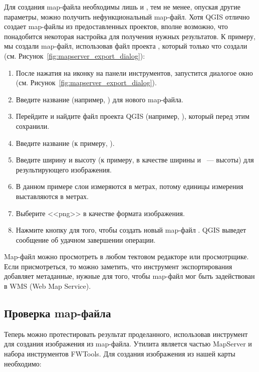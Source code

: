 Для создания map-файла необходимы лишь  и
, тем не менее, опуская другие параметры,
можно получить нефункциональный map-файл. Хотя QGIS отлично создает map-файлы из
предоставленных проектов, вполне возможно, что понадобится некоторая
настройка для получения нужных результатов. К примеру, мы создали
map-файл, использовав файл проекта ,
который только что создали (см. Рисунок~\ref{fig:mapserver_export_dialog}):

\begin{enumerate}
  \item После нажатия на иконку 
  на панели инструментов, запустится диалогое окно (см. Рисунок~\ref{fig:mapserver_export_dialog}).
  \item Введите название (например, ) для
  нового map-файла.
  \item Перейдите и найдите файл проекта QGIS
  (например, ), который перед этим
  сохранили.
  \item Введите название (к примеру, ).
  \item Введите ширину и высоту (к примеру,  в качестве
  ширины и ~--- высоты) для результирующего изображения.
  \item В данном примере слои измеряются в метрах, потому единицы
  измерения выставляются в метрах.
  \item Выберите <<png>> в качестве формата изображения.
  \item Нажмите кнопку  для того, чтобы создать новый
  map-файл . QGIS выведет сообщение об
  удачном завершении операции.
\end{enumerate}

Map-файл можно просмотреть в любом тектовом редакторе или просмотрщике.
Если присмотреться, то можно заметить, что инструмент экспортирования
добавляет метаданные, нужные для того, чтобы map-файл мог быть
задействован в WMS (Web Map Service).

\subsection{Проверка map-файла}

Теперь можно протестировать результат проделанного, использовав
инструмент  для создания изображения из map-файла.
Утилита  является частью MapServer и набора
инструментов FWTools. Для
создания изображения из нашей карты необходимо:

